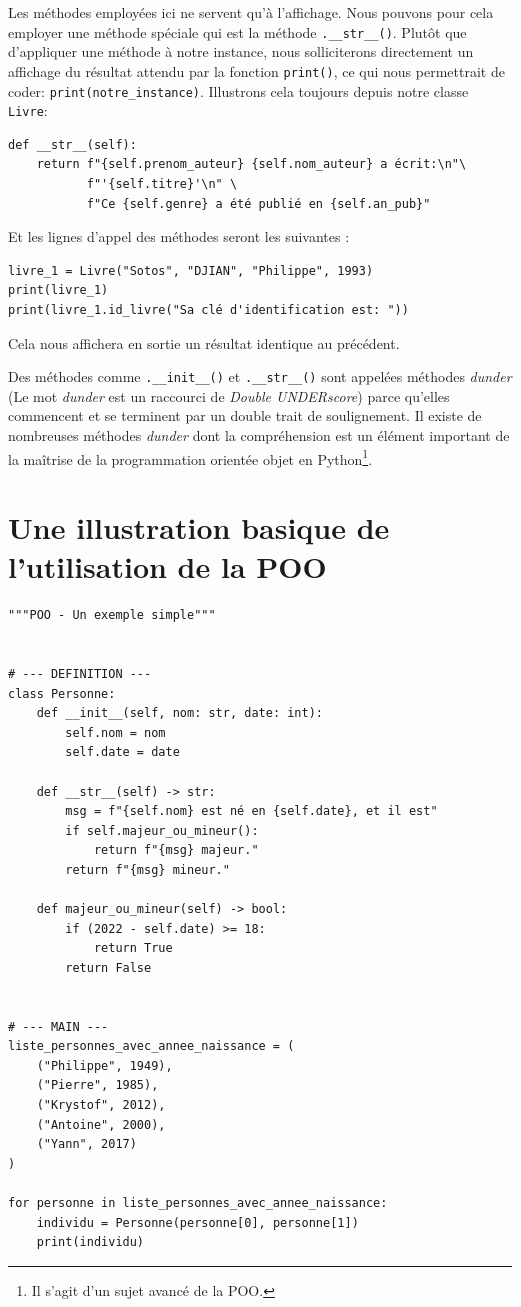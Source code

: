 \documentclass[a4paper,11pt]{book}
\begin{document}
Les méthodes employées ici ne servent qu'à l'affichage. Nous pouvons pour cela employer une méthode spéciale qui est la méthode \texttt{.\_\_str\_\_()}. Plutôt que d'appliquer une méthode à notre instance, nous solliciterons directement un affichage du résultat attendu par la fonction \texttt{print()}, ce qui nous permettrait de coder:  \texttt{print(notre\_instance)}. Illustrons cela toujours depuis notre classe \texttt{Livre}:
\begin{lstlisting}[caption=La méthode  \texttt{.\_\_str\_\_()}]
def __str__(self):
    return f"{self.prenom_auteur} {self.nom_auteur} a écrit:\n"\
           f"'{self.titre}'\n" \
           f"Ce {self.genre} a été publié en {self.an_pub}"
\end{lstlisting}
\medskip

Et les lignes d’appel des méthodes seront les suivantes :
\begin{lstlisting}[caption=Appel de la méthode  \texttt{.\_\_str\_\_()}]
livre_1 = Livre("Sotos", "DJIAN", "Philippe", 1993)
print(livre_1)
print(livre_1.id_livre("Sa clé d'identification est: "))
\end{lstlisting}
\medskip

Cela nous affichera en sortie un résultat identique au précédent.
\medskip

Des méthodes comme \texttt{.\_\_init\_\_()} et \texttt{.\_\_str\_\_()} sont appelées méthodes \textit{dunder} (Le mot \textit{dunder} est un raccourci de \textit{Double UNDERscore}) parce qu'elles commencent et se terminent par un double trait de soulignement. Il existe de nombreuses méthodes \textit{dunder} dont la compréhension est un élément important de la maîtrise de la programmation orientée objet en Python\footnote{Il s'agit d'un sujet avancé de la POO.}.
\medskip

\section{Une illustration basique de l'utilisation de la POO}
\begin{lstlisting}[caption=Quel est l'âge de chacun ?]
"""POO - Un exemple simple"""


# --- DEFINITION ---
class Personne:
    def __init__(self, nom: str, date: int):
        self.nom = nom
        self.date = date

    def __str__(self) -> str:
        msg = f"{self.nom} est né en {self.date}, et il est"
        if self.majeur_ou_mineur():
            return f"{msg} majeur."
        return f"{msg} mineur."

    def majeur_ou_mineur(self) -> bool:
        if (2022 - self.date) >= 18:
            return True
        return False


# --- MAIN ---
liste_personnes_avec_annee_naissance = (
    ("Philippe", 1949),
    ("Pierre", 1985),
    ("Krystof", 2012),
    ("Antoine", 2000),
    ("Yann", 2017)
)

for personne in liste_personnes_avec_annee_naissance:
    individu = Personne(personne[0], personne[1])
    print(individu)
\end{lstlisting}
\medskip
\end{document}
